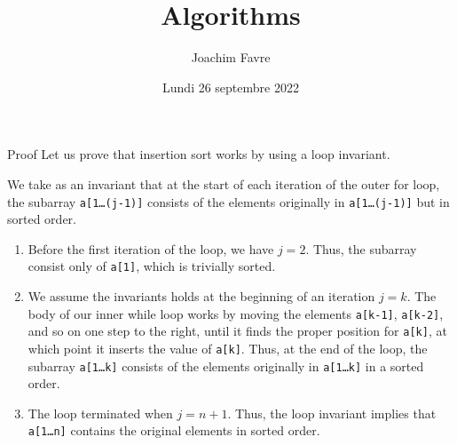 \documentclass[a4paper]{article}
\title{Algorithms}
\author{Joachim Favre}
\date{Lundi 26 septembre 2022}
\begin{document}
\maketitle


\begin{parag}{Proof}
    Let us prove that insertion sort works by using a loop invariant.

    We take as an invariant that at the start of each iteration of the outer for loop, the subarray \texttt{a[1\ldots (j-1)]} consists of the elements originally in \texttt{a[1\ldots (j-1)]} but in sorted order.
    \begin{enumerate}
        \item Before the first iteration of the loop, we have $j = 2$. Thus, the subarray consist only of \texttt{a[1]}, which is trivially sorted.
        \item We assume the invariants holds at the beginning of an iteration $j = k$. The body of our inner while loop works by moving the elements \texttt{a[k-1]}, \texttt{a[k-2]}, and so on one step to the right, until it finds the proper position for \texttt{a[k]}, at which point it inserts the value of \texttt{a[k]}. Thus, at the end of the loop, the subarray \texttt{a[1\ldots k]} consists of the elements originally in \texttt{a[1\ldots k]} in a sorted order.
        \item The loop terminated when $j = n + 1$. Thus, the loop invariant implies that \texttt{a[1\ldots n]} contains the original elements in sorted order.
    \end{enumerate}
\end{parag}
\end{document}
